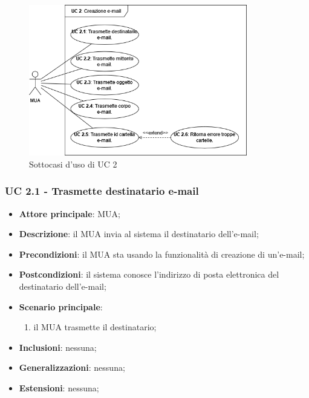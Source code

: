     \begin{figure}[h]
        \includegraphics[width=0.85\textwidth]{sections/uc_imgs/UC02.png}
        \centering
        \caption{Sottocasi d'uso di UC 2}
    \end{figure}

    \subsubsection{UC 2.1 - Trasmette destinatario e-mail} \label{sec:UC2.1}
    \begin{itemize}
        \item \textbf{Attore principale}: MUA;
        \item \textbf{Descrizione}: il MUA invia al sistema il destinatario dell'e-mail;
        \item \textbf{Precondizioni}: il MUA sta usando la funzionalità di creazione di un'e-mail;
        \item \textbf{Postcondizioni}: il sistema conosce l'indirizzo di posta elettronica del destinatario dell'e-mail;
        \item \textbf{Scenario principale}:
            \begin{enumerate}
                \item il MUA trasmette il destinatario;
            \end{enumerate}
        \item \textbf{Inclusioni}: nessuna;
        \item \textbf{Generalizzazioni}: nessuna;
        \item \textbf{Estensioni}: nessuna;
    \end{itemize}

